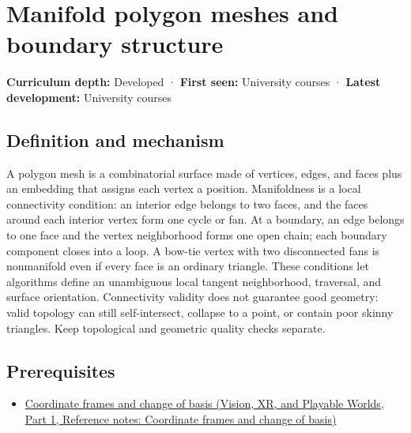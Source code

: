 \hypertarget{appendix-fab348609369}{}\label{referencestart:appendix-fab348609369}
\section{Manifold polygon meshes and boundary structure}\label{appendix-fab348609369-manifold-polygon-meshes-and-boundary-structure}

\hypertarget{appendix-fab348609369-manifold-polygon-meshes-and-boundary-structure}{}

\textbf{Curriculum depth:} Developed · \textbf{First seen:} University courses · \textbf{Latest development:} University courses

\begin{allmightroledefinition}

\subsection{Definition and mechanism}\label{appendix-fab348609369-definition-and-mechanism}

\hypertarget{appendix-fab348609369-definition-and-mechanism}{}

A polygon mesh is a combinatorial surface made of vertices, edges, and faces plus an embedding that assigns each vertex a position. Manifoldness is a local connectivity condition: an interior edge belongs to two faces, and the faces around each interior vertex form one cycle or fan. At a boundary, an edge belongs to one face and the vertex neighborhood forms one open chain; each boundary component closes into a loop. A bow-tie vertex with two disconnected fans is nonmanifold even if every face is an ordinary triangle. These conditions let algorithms define an unambiguous local tangent neighborhood, traversal, and surface orientation. Connectivity validity does not guarantee good geometry: valid topology can still self-intersect, collapse to a point, or contain poor skinny triangles. Keep topological and geometric quality checks separate.

\end{allmightroledefinition}

\subsection{Prerequisites}\label{appendix-fab348609369-prerequisites}

\hypertarget{appendix-fab348609369-prerequisites}{}

\begin{itemize}
\tightlist
\item
  \href{../07-Vision-XR-and-Playable-Worlds-P01/main.pdf\#appendix-1bae9457dbc3}{Coordinate frames and change of basis (Vision, XR, and Playable Worlds, Part 1, Reference notes: Coordinate frames and change of basis)}
\end{itemize}

